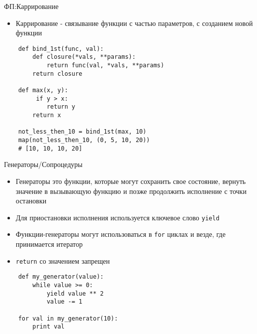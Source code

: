 \documentclass{article}
\begin{document}
\begin{center} ФП:Каррирование \end{center}
\begin{itemize}
    \item Каррирование - связывание функции с частью параметров, с созданием новой функции
\end{itemize}
\vspace{15pt}
\begin{lstlisting}
    def bind_1st(func, val):
        def closure(*vals, **params):
            return func(val, *vals, **params)
        return closure

    def max(x, y):
         if y > x:
            return y
        return x

    not_less_then_10 = bind_1st(max, 10)
    map(not_less_then_10, (0, 5, 10, 20))
    # [10, 10, 10, 20]
\end{lstlisting}
\newpage

\begin{center} Генераторы/Сопроцедуры \end{center}
\begin{itemize}
    \item Генераторы это функции, которые могут сохранить свое состояние, вернуть 
        значение в вызывающую функцию и позже продолжить исполнение с точки остановки
    \item Для приостановки исполнения используется ключевое слово \lstinline!yield!
    \item Функции-генераторы могут использоваться в \LARGE\lstinline!for! циклах и везде, где
        принимается итератор
    \item \lstinline!return! со значением запрещен
\end{itemize}
\vspace{15pt}
\begin{lstlisting}
    def my_generator(value):
        while value >= 0:
            yield value ** 2
            value -= 1

    for val in my_generator(10):
        print val
\end{lstlisting}
\newpage
\end{document}
